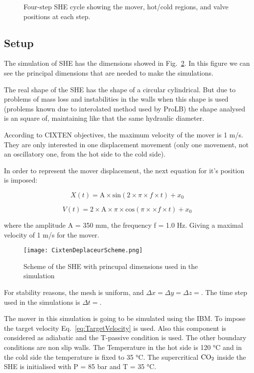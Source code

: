 \begin{figure}[htbp]
    \caption{Four-step SHE cycle showing the mover, hot/cold regions, and valve positions at each step.}
    \label{fig:she_cycle_simple}
\end{figure}


\subsection{Setup}

The simulation of SHE has the dimensions showed in
Fig.~\ref{fig:CixtenDeplaceurScheme}. In this figure we can see the principal
dimensions that are needed to make the simulations. 

The real shape of the SHE has the shape of a circular cylindrical. But due to
problems of mass loss and instabilities in the walls when this shape is used
(problems known due to interolated method used by ProLB) the shape analysed is
an square of, maintaining like that the same hydraulic diameter. 

According to CIXTEN objectives, the maximum velocity of the mover is 1 m/s. They
are only interested in one displacement movement (only one movement, not an
oscillatory one, from the hot side to the cold side).

In order to represent the mover displacement, the next equation for it's
position is imposed:

\begin{equation}
    X(t) = \mathrm{A} \times \mathrm{sin}(2 \times \pi \times f \times t) + x_0
\end{equation}

\begin{equation}
    V(t) = 2\times \mathrm{A} \times \pi \times \mathrm{cos}(\pi \times  \times f \times t) + x_0
    \label{eq:TargetVelocity}
\end{equation}

where the amplitude A = 350 mm, the frequency f = 1.0 Hz. Giving a maximal
velocity of  1 m/s for the mover.

\begin{figure}[htbp]
	\centering
	\texttt{[image: CixtenDeplaceurScheme.png]}
	\caption{Scheme of the SHE with princupal dimensions used in the simulation}
\label{fig:CixtenDeplaceurScheme}
\end{figure}

For stability reasons, the mesh is uniform, and $\Delta x = \Delta y = \Delta z = $.
The time step used in the simulations is $\Delta t = $.

The mover in this simulation is going to be simulated using the IBM. To impose
the target velocity Eq.~\ref{eq:TargetVelocity} is used. Also this component is
considered as adiabatic and the T-passive condition is used. The other boundary
conditions are non slip walls. The Temperature in the hot side is 120 °C and in
the cold side the temperature is fixed to 35 °C. The supercritical $\ce{CO2}$
inside the SHE is initialised with P = 85 bar and T = 35 °C.

